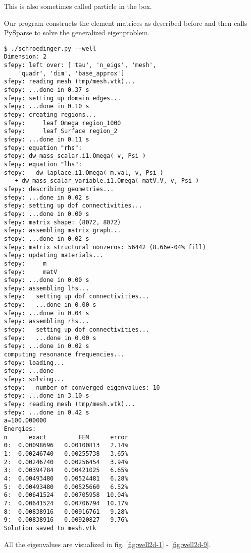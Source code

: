 This is also sometimes called particle in the box.

Our program constructs the element matrices as described before and then calls
PySparse\cite{geus} to solve the generalized eigenproblem.

\begin{lstlisting}
$ ./schroedinger.py --well
Dimension: 2
sfepy: left over: ['tau', 'n_eigs', 'mesh',
    'quadr', 'dim', 'base_approx']
sfepy: reading mesh (tmp/mesh.vtk)...
sfepy: ...done in 0.37 s
sfepy: setting up domain edges...
sfepy: ...done in 0.10 s
sfepy: creating regions...
sfepy:     leaf Omega region_1000
sfepy:     leaf Surface region_2
sfepy: ...done in 0.11 s
sfepy: equation "rhs":
sfepy: dw_mass_scalar.i1.Omega( v, Psi )
sfepy: equation "lhs":
sfepy:   dw_laplace.i1.Omega( m.val, v, Psi )
   + dw_mass_scalar_variable.i1.Omega( matV.V, v, Psi )
sfepy: describing geometries...
sfepy: ...done in 0.02 s
sfepy: setting up dof connectivities...
sfepy: ...done in 0.00 s
sfepy: matrix shape: (8072, 8072)
sfepy: assembling matrix graph...
sfepy: ...done in 0.02 s
sfepy: matrix structural nonzeros: 56442 (8.66e-04% fill)
sfepy: updating materials...
sfepy:     m
sfepy:     matV
sfepy: ...done in 0.00 s
sfepy: assembling lhs...
sfepy:   setting up dof connectivities...
sfepy:   ...done in 0.00 s
sfepy: ...done in 0.04 s
sfepy: assembling rhs...
sfepy:   setting up dof connectivities...
sfepy:   ...done in 0.00 s
sfepy: ...done in 0.02 s
computing resonance frequencies...
sfepy: loading...
sfepy: ...done
sfepy: solving...
sfepy:   number of converged eigenvalues: 10
sfepy: ...done in 3.10 s
sfepy: reading mesh (tmp/mesh.vtk)...
sfepy: ...done in 0.42 s
a=100.000000
Energies:
n      exact         FEM      error
0:  0.00098696   0.00100813   2.14%
1:  0.00246740   0.00255738   3.65%
2:  0.00246740   0.00256454   3.94%
3:  0.00394784   0.00421025   6.65%
4:  0.00493480   0.00524481   6.28%
5:  0.00493480   0.00525660   6.52%
6:  0.00641524   0.00705958  10.04%
7:  0.00641524   0.00706794  10.17%
8:  0.00838916   0.00916761   9.28%
9:  0.00838916   0.00920827   9.76%
Solution saved to mesh.vtk
\end{lstlisting}

All the eigenvalues are visualized in fig. \ref{fig:well2d-1} -
\ref{fig:well2d-9}.




